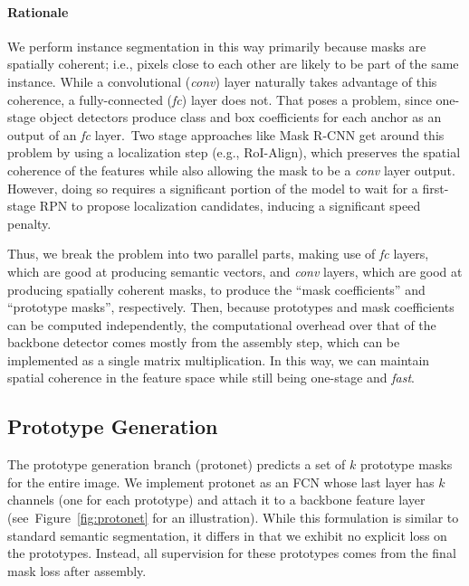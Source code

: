 \documentclass[10pt,journal,compsoc]{IEEEtran}
\begin{document}
\paragraph{Rationale}
We perform instance segmentation in this way primarily because masks are spatially coherent; i.e., pixels close to each other are likely to be part of the same instance. While a convolutional (\textit{conv}) layer naturally takes advantage of this coherence, a fully-connected (\textit{fc}) layer does not. That poses a problem, since one-stage object detectors produce class and box coefficients for each anchor as an output of an \textit{fc} layer.\footnotemark ~Two stage approaches like Mask R-CNN get around this problem by using a localization step (e.g., RoI-Align), which preserves the spatial coherence of the features while also allowing the mask to be a \textit{conv} layer output. However, doing so requires a significant portion of the model to wait for a first-stage RPN to propose localization candidates, inducing a significant speed penalty.


Thus, we break the problem into two parallel parts, making use of \textit{fc} layers, which are good at producing semantic vectors, and \textit{conv} layers, which are good at producing spatially coherent masks, to produce the ``mask coefficients'' and ``prototype masks'', respectively. Then, because prototypes and mask coefficients can be computed independently, the computational overhead over that of the backbone detector comes mostly from the assembly step, which can be implemented as a single matrix multiplication.  In this way, we can maintain spatial coherence in the feature space while still being one-stage and \emph{fast}.

\subsection{Prototype Generation}
The prototype generation branch (protonet) predicts a set of $k$ prototype masks for the entire image. We implement protonet as an FCN whose last layer has $k$ channels (one for each prototype) and attach it to a backbone feature layer (see~Figure~\ref{fig:protonet} for an illustration). While this formulation is similar to standard semantic segmentation, it differs in that we exhibit no explicit loss on the prototypes. Instead, all supervision for these prototypes comes from the final mask loss after assembly.
\end{document}
